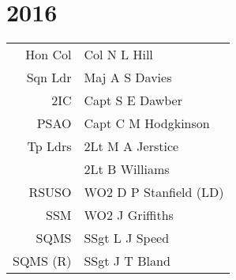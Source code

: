 \chapter*{2016}

\begin{center}
  \begin{tabular}{rl}
    Hon Col & Col N L Hill \\
    Sqn Ldr & Maj A S Davies \\
    2IC & Capt S E Dawber \\
    PSAO & Capt C M Hodgkinson \\
    Tp Ldrs & 2Lt M A Jerstice \\
     & 2Lt B Williams \\
    RSUSO & WO2 D P Stanfield (LD) \\
    SSM & WO2 J Griffiths \\
    SQMS & SSgt L J Speed \\
    SQMS (R) & SSgt J T Bland \\
  \end{tabular}
\end{center}

